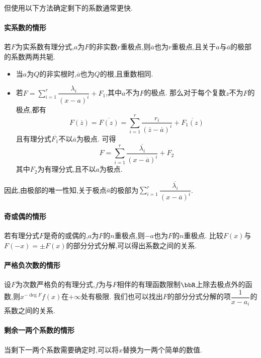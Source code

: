 但使用以下方法确定剩下的系数通常更快.

\paragraph*{实系数的情形}

若$F$为实系数有理分式,$a$为$F$的非实数$r$重极点,则$\overline{a}$也为$r$重极点,且关于$a$与$\overline{a}$的极部的系数两两共轭.

\begin{itemize}
    \item 当$a$为$Q$的非实根时,$\overline{a}$也为$Q$的根,且重数相同.
    \item 若$F = \sum\limits_{i = 1}^{r} \dfrac{\lambda_i}{(x - a)^i} + F_1$,其中$a$不为$F$的极点.
        那么对于每个复数$z$不为$F$的极点,都有
        \[ F(\overline{z}) = \overline{F(z)} = \sum\limits_{i = 1}^r \dfrac{r_i}{(\overline{z} - \overline{a})^i} + \overline{F_1(z)} \]
        且有理分式$\overline{F_1}$不以$\overline{a}$为极点.
        可得\[ F = \sum\limits_{i = 1}^r \dfrac{\overline{\lambda_i}}{(x - \overline{a})^i} + F_2 \]
        其中$F_2$为有理分式,且不以$a$为极点.
\end{itemize}

因此,由极部的唯一性知,关于极点$\overline{a}$的极部为$\sum\limits_{i = 1}^r \dfrac{\overline{\lambda_i}}{(x - \overline{a})^i}$.

\paragraph*{奇或偶的情形}

若有理分式$F$是奇的或偶的,$a$为$F$的$n$重极点,则$-a$也为$F$的$n$重极点.
比较$F(x)$与$F(-x) = \pm F(x)$的部分分式分解,可以得出系数之间的关系.

\paragraph*{严格负次数的情形}

设$F$为次数严格负的有理分式,$f$为与$F$相伴的有理函数限制$\bbR$上除去极点外的函数,则$x^{-\deg F} f(x)$在$+\infty$处有极限.
我们也可以找出$F$的部分分式分解的项$\dfrac{1}{x - a_i}$的系数之间的关系.

\paragraph*{剩余一两个系数的情形}

当剩下一两个系数需要确定时,可以将$x$替换为一两个简单的数值.

